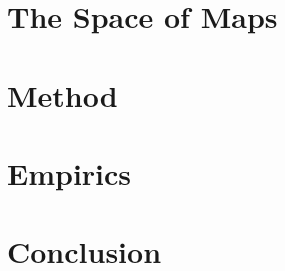 \documentclass[11pt]{book}
\theoremstyle{definition}
\begin{document}


\part{The Space of Maps}\label{part:catalog}





\part{Method}\label{part:method}




\part{Empirics}\label{part:results}






\part{Conclusion}\label{part:conclusion}



\end{document}
